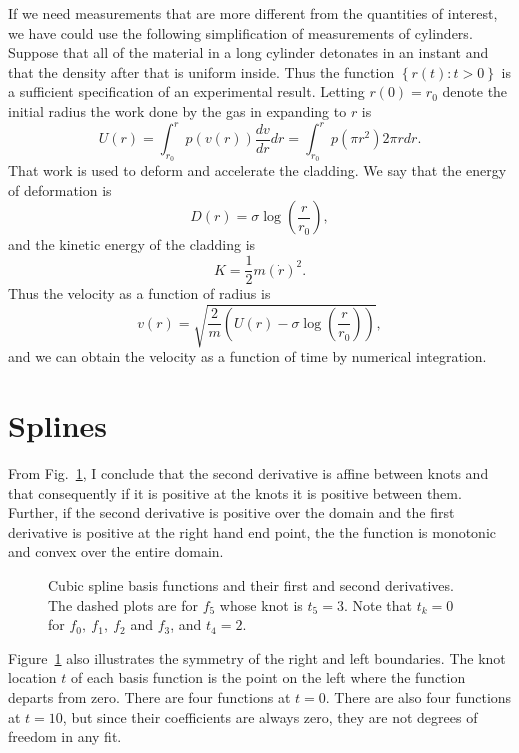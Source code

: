 \documentclass[11pt]{article}
\begin{document}
If we need measurements that are more different from the quantities of
interest, we have could use the following simplification of
measurements of cylinders.  Suppose that all of the material in a long
cylinder detonates in an instant and that the density after that is
uniform inside.  Thus the function $\left\{r(t): t>0 \right\}$ is a
sufficient specification of an experimental result.  Letting
$r(0) = r_0$ denote the initial radius the work done by the gas in
expanding to $r$ is
\begin{equation*}
  U(r) = \int_{r_0}^r p(v(r)) \frac{dv}{dr} dr = \int_{r_0}^r p(\pi
  r^2) 2\pi r dr.
\end{equation*}
That work is used to deform and accelerate the cladding.  We say that
the energy of deformation is
\begin{equation*}
  D(r) = \sigma \log \left(\frac{r}{r_0} \right),
\end{equation*}
and the kinetic energy of the cladding is
\begin{equation*}
  K = \frac{1}{2} m \left( \dot r \right)^2.
\end{equation*}
Thus the velocity as a function of radius is
\begin{equation*}
  v(r) = \sqrt{\frac{2}{m} \left( U(r) - \sigma \log
      \left(\frac{r}{r_0} \right) \right) },
\end{equation*}
and we can obtain the velocity as a function of time by numerical
integration.

\section{Splines}
\label{sec:splines}

From Fig.~\ref{fig:basis}, I conclude that the second derivative is
affine between knots and that consequently if it is positive at the
knots it is positive between them.  Further, if the second derivative
is positive over the domain and the first derivative is positive at
the right hand end point, the the function is monotonic and convex
over the entire domain.
\begin{figure}
  \centering
    \caption{Cubic spline basis functions and their first and second
      derivatives. The dashed plots are for $f_5$ whose knot is
      $t_5=3$.  Note that $t_k=0$ for $f_0,~f_1,~f_2$ and $f_3$, and
      $t_4=2$.}
  \label{fig:basis}
\end{figure}

Figure~\ref{fig:basis} also illustrates the symmetry of the right and
left boundaries.  The knot location $t$ of each basis function is the
point on the left where the function departs from zero.  There are
four functions at $t=0$.  There are also four functions at $t=10$, but
since their coefficients are always zero, they are not degrees of
freedom in any fit.
\end{document}
